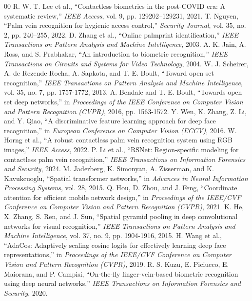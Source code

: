 \documentclass[12pt,a4paper]{article}
\begin{document}
\begin{thebibliography}{00}
 R. W. T. Lee et al., ``Contactless biometrics in the post-COVID era: A systematic review,'' \textit{IEEE Access}, vol. 9, pp. 129202--129231, 2021.
 T. Nguyen, ``Palm vein recognition for hygienic access control,'' \textit{Security Journal}, vol. 35, no. 2, pp. 240--255, 2022.
 D. Zhang et al., ``Online palmprint identification,'' \textit{IEEE Transactions on Pattern Analysis and Machine Intelligence}, 2003.
 A. K. Jain, A. Ross, and S. Prabhakar, ``An introduction to biometric recognition,'' \textit{IEEE Transactions on Circuits and Systems for Video Technology}, 2004.
 W. J. Scheirer, A. de Rezende Rocha, A. Sapkota, and T. E. Boult, ``Toward open set recognition,'' \textit{IEEE Transactions on Pattern Analysis and Machine Intelligence}, vol. 35, no. 7, pp. 1757-1772, 2013.
 A. Bendale and T. E. Boult, ``Towards open set deep networks,'' in \textit{Proceedings of the IEEE Conference on Computer Vision and Pattern Recognition (CVPR)}, 2016, pp. 1563-1572.
 Y. Wen, K. Zhang, Z. Li, and Y. Qiao, ``A discriminative feature learning approach for deep face recognition,'' in \textit{European Conference on Computer Vision (ECCV)}, 2016.
 W. Horng et al., ``A robust contactless palm vein recognition system using RGB images,'' \textit{IEEE Access}, 2022.
 P. Li et al., ``RSNet: Region-specific modeling for contactless palm vein recognition,'' \textit{IEEE Transactions on Information Forensics and Security}, 2024.
 M. Jaderberg, K. Simonyan, A. Zisserman, and K. Kavukcuoglu, ``Spatial transformer networks,'' in \textit{Advances in Neural Information Processing Systems}, vol. 28, 2015.
 Q. Hou, D. Zhou, and J. Feng, ``Coordinate attention for efficient mobile network design,'' in \textit{Proceedings of the IEEE/CVF Conference on Computer Vision and Pattern Recognition (CVPR)}, 2021.
 K. He, X. Zhang, S. Ren, and J. Sun, ``Spatial pyramid pooling in deep convolutional networks for visual recognition,'' \textit{IEEE Transactions on Pattern Analysis and Machine Intelligence}, vol. 37, no. 9, pp. 1904-1916, 2015.
 H. Wang et al., ``AdaCos: Adaptively scaling cosine logits for effectively learning deep face representations,'' in \textit{Proceedings of the IEEE/CVF Conference on Computer Vision and Pattern Recognition (CVPR)}, 2019.
 R. S. Kuzu, E. Piciucco, E. Maiorana, and P. Campisi, ``On-the-fly finger-vein-based biometric recognition using deep neural networks,'' \textit{IEEE Transactions on Information Forensics and Security}, 2020.

\end{thebibliography}
\end{document}
